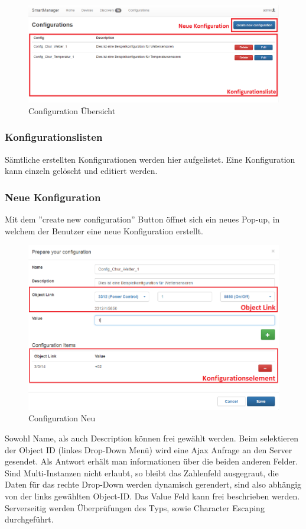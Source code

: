 \begin{figure}[H]
\centering
\includegraphics[scale=0.57]{../04_Realisierung/images/userinterface/config_overview.png}
\caption{Configuration Übersicht}
\end{figure}

\subsubsection{Konfigurationslisten}
Sämtliche erstellten Konfigurationen werden hier aufgelistet. Eine Konfiguration kann einzeln gelöscht und editiert werden.
 \newpage

\subsubsection{Neue Konfiguration}
Mit dem ''create new configuration'' Button öffnet sich ein neues Pop-up, in welchem der Benutzer eine neue Konfiguration erstellt.

\begin{figure}[H]
\centering
\includegraphics[scale=0.6]{../04_Realisierung/images/userinterface/config.png}
\caption{Configuration Neu}
\end{figure}
Sowohl Name, als auch Description können frei gewählt werden. Beim selektieren der Object ID (linkes Drop-Down Menü) wird eine Ajax Anfrage an den Server gesendet. Als Antwort erhält man informationen über die beiden anderen Felder. Sind Multi-Instanzen nicht erlaubt, so bleibt das Zahlenfeld ausgegraut, die Daten für das rechte Drop-Down werden dynamisch gerendert, sind also abhängig von der links gewählten Object-ID. Das Value Feld kann frei beschrieben werden. Serverseitig werden Überprüfungen des Typs, sowie Character Escaping durchgeführt.

